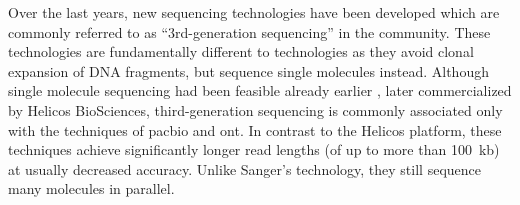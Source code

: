 
Over the last years, new sequencing technologies have been developed which are
commonly referred to as ``3rd-generation sequencing'' in the community. These
technologies are fundamentally different to \mps technologies as they avoid
clonal expansion of DNA fragments, but sequence single molecules instead.
Although single molecule sequencing had been feasible already earlier
\citep{Braslavsky2003}, later commercialized by Helicos BioSciences,
third-generation sequencing is commonly associated only with the techniques of
\acf{pacbio} and \acf{ont}. In contrast to the Helicos platform, these
techniques achieve significantly longer read lengths (of up to more than 100~kb)
at usually decreased accuracy. Unlike Sanger's technology, they still sequence
many molecules in parallel.

